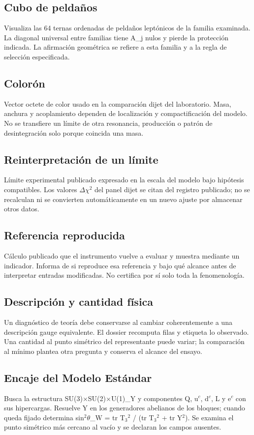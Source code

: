 \documentclass[11pt,a4paper]{article}
\begin{document}
\subsection*{Cubo de peldaños}
Visualiza las 64 ternas ordenadas de peldaños leptónicos de la familia examinada. La diagonal universal entre familias tiene A\_j nulos y pierde la protección indicada. La afirmación geométrica se refiere a esta familia y a la regla de selección especificada.

\subsection*{Colorón}
Vector octete de color usado en la comparación dijet del laboratorio. Masa, anchura y acoplamiento dependen de localización y compactificación del modelo. No se transfiere un límite de otra resonancia, producción o patrón de desintegración solo porque coincida una masa.

\subsection*{Reinterpretación de un límite}
Límite experimental publicado expresado en la escala del modelo bajo hipótesis compatibles. Los valores \ensuremath{\Delta}\ensuremath{\chi}\ensuremath{{}^{2}} del panel dijet se citan del registro publicado; no se recalculan ni se convierten automáticamente en un nuevo ajuste por almacenar otros datos.

\subsection*{Referencia reproducida}
Cálculo publicado que el instrumento vuelve a evaluar y muestra mediante un indicador. Informa de si reproduce esa referencia y bajo qué alcance antes de interpretar entradas modificadas. No certifica por sí solo toda la fenomenología.

\subsection*{Descripción y cantidad física}
Un diagnóstico de teoría debe conservarse al cambiar coherentemente a una descripción gauge equivalente. El dossier recomputa filas y etiqueta lo observado. Una cantidad al punto simétrico del representante puede variar; la comparación al mínimo plantea otra pregunta y conserva el alcance del ensayo.

\subsection*{Encaje del Modelo Estándar}
Busca la estructura SU(3)\ensuremath{\times}SU(2)\ensuremath{\times}U(1)\_Y y componentes Q, u\ensuremath{{}^{c}}, d\ensuremath{{}^{c}}, L y e\ensuremath{{}^{c}} con sus hipercargas. Resuelve Y en los generadores abelianos de los bloques; cuando queda fijado determina sin\ensuremath{{}^{2}}\ensuremath{\theta}\_W = tr T\ensuremath{{}_{3}}\ensuremath{{}^{2}} / (tr T\ensuremath{{}_{3}}\ensuremath{{}^{2}} + tr Y\ensuremath{{}^{2}}). Se examina el punto simétrico más cercano al vacío y se declaran los campos ausentes.
\end{document}
